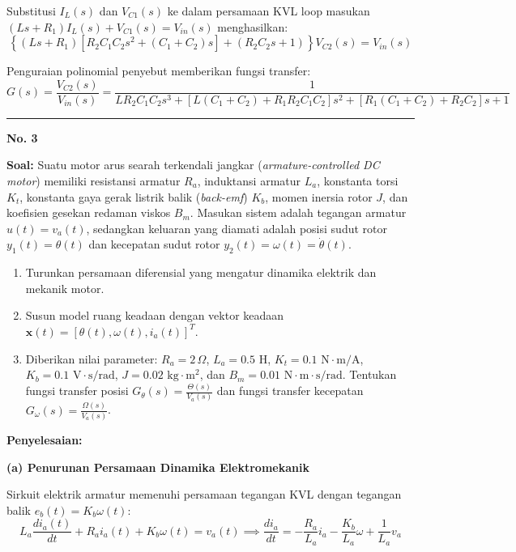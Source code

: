 \documentclass[11pt,a4paper]{article}
\begin{document}
Substitusi $I_L(s)$ dan $V_{C1}(s)$ ke dalam persamaan KVL loop masukan $(L s + R_1) I_L(s) + V_{C1}(s) = V_{in}(s)$ menghasilkan:
$$\left\{ (L s + R_1)\left[ R_2 C_1 C_2 s^2 + (C_1 + C_2) s \right] + (R_2 C_2 s + 1) \right\} V_{C2}(s) = V_{in}(s)$$

Penguraian polinomial penyebut memberikan fungsi transfer:
$$G(s) = \frac{V_{C2}(s)}{V_{in}(s)} = \frac{1}{L R_2 C_1 C_2 s^3 + [L(C_1 + C_2) + R_1 R_2 C_1 C_2] s^2 + [R_1(C_1 + C_2) + R_2 C_2] s + 1}$$

\vspace{12pt}
\hrule
\vspace{10pt}

\textbf{\large No. 3}

\textbf{Soal:}  
Suatu motor arus searah terkendali jangkar (\textit{armature-controlled DC motor}) memiliki resistansi armatur $R_a$, induktansi armatur $L_a$, konstanta torsi $K_t$, konstanta gaya gerak listrik balik (\textit{back-emf}) $K_b$, momen inersia rotor $J$, dan koefisien gesekan redaman viskos $B_m$. Masukan sistem adalah tegangan armatur $u(t) = v_a(t)$, sedangkan keluaran yang diamati adalah posisi sudut rotor $y_1(t) = \theta(t)$ dan kecepatan sudut rotor $y_2(t) = \omega(t) = \dot{\theta}(t)$.
\begin{enumerate}[label=(\alph*)]
    \item Turunkan persamaan diferensial yang mengatur dinamika elektrik dan mekanik motor.
    \item Susun model ruang keadaan dengan vektor keadaan $\mathbf{x}(t) = [\theta(t), \omega(t), i_a(t)]^T$.
    \item Diberikan nilai parameter: $R_a = 2\,\Omega$, $L_a = 0.5\text{ H}$, $K_t = 0.1\text{ N}\cdot\text{m/A}$, $K_b = 0.1\text{ V}\cdot\text{s/rad}$, $J = 0.02\text{ kg}\cdot\text{m}^2$, dan $B_m = 0.01\text{ N}\cdot\text{m}\cdot\text{s/rad}$. Tentukan fungsi transfer posisi $G_\theta(s) = \frac{\Theta(s)}{V_a(s)}$ dan fungsi transfer kecepatan $G_\omega(s) = \frac{\Omega(s)}{V_a(s)}$.
\end{enumerate}

\textbf{Penyelesaian:}

\textbf{(a) Penurunan Persamaan Dinamika Elektromekanik}

Sirkuit elektrik armatur memenuhi persamaan tegangan KVL dengan tegangan balik $e_b(t) = K_b \omega(t)$:
$$L_a \frac{di_a(t)}{dt} + R_a i_a(t) + K_b \omega(t) = v_a(t) \implies \frac{di_a}{dt} = -\frac{R_a}{L_a} i_a - \frac{K_b}{L_a} \omega + \frac{1}{L_a} v_a$$
\end{document}
